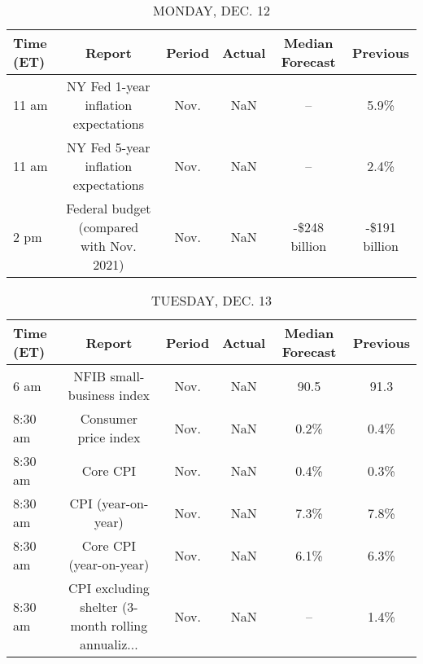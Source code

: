 \documentclass{article}%
\begin{document}
%
\normalsize%


\begin{table}[htbp]%
\caption{MONDAY, DEC. 12}%
\centering%
\begin{adjustbox}{width=1\textwidth}%
\begin{tabular}{lccccc}
\toprule
Time (ET) &                                   Report & Period & Actual & Median Forecast &      Previous \\
\midrule
    11 am &     NY Fed 1-year inflation expectations &   Nov. &    NaN &              -- &          5.9\% \\
    11 am &     NY Fed 5-year inflation expectations &   Nov. &    NaN &              -- &          2.4\% \\
     2 pm & Federal budget (compared with Nov. 2021) &   Nov. &    NaN &   -\$248 billion & -\$191 billion \\
\bottomrule
\end{tabular}
%
\end{adjustbox}%
\end{table}

%


\begin{table}[htbp]%
\caption{TUESDAY, DEC. 13}%
\centering%
\begin{adjustbox}{width=1\textwidth}%
\begin{tabular}{lccccc}
\toprule
Time (ET) &                                             Report & Period & Actual & Median Forecast & Previous \\
\midrule
     6 am &                          NFIB small-business index &   Nov. &    NaN &            90.5 &     91.3 \\
  8:30 am &                               Consumer price index &   Nov. &    NaN &            0.2\% &     0.4\% \\
  8:30 am &                                           Core CPI &   Nov. &    NaN &            0.4\% &     0.3\% \\
  8:30 am &                                 CPI (year-on-year) &   Nov. &    NaN &            7.3\% &     7.8\% \\
  8:30 am &                            Core CPI (year-on-year) &   Nov. &    NaN &            6.1\% &     6.3\% \\
  8:30 am & CPI excluding shelter (3-month rolling annualiz... &   Nov. &    NaN &              -- &     1.4\% \\
\bottomrule
\end{tabular}
%
\end{adjustbox}%
\end{table}
\end{document}
